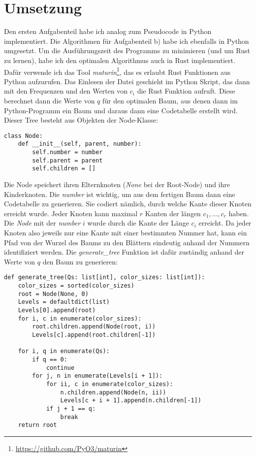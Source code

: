 \documentclass[a4paper,10pt,ngerman]{scrartcl}
\begin{document}
    \section{Umsetzung}
    Den ersten Aufgabenteil habe ich analog zum Pseudocode in Python implementiert.
    Die Algorithmen für Aufgabenteil b) habe ich ebenfalls in Python umgesetzt.
    Um die Ausführungszeit des Programms zu minimieren (und um Rust zu lernen), habe ich den optimalen Algorithmus auch in Rust implementiert.
    Dafür verwende ich das Tool \textit{maturin}\footnote{\url{https://github.com/PyO3/maturin}}, das es erlaubt Rust Funktionen aus Python aufzurufen.
    Das Einlesen der Datei geschieht im Python Skript, das dann mit den Frequenzen und den Werten von $c_i$ die Rust Funktion aufruft.
    Diese berechnet dann die Werte von $q$ für den optimalen Baum, aus denen dann im Python-Programm ein Baum und daraus dann eine Codetabelle erstellt wird.
    Dieser Tree besteht aus Objekten der Node-Klasse:
    \begin{verbatim}
class Node:
    def __init__(self, parent, number):
        self.number = number
        self.parent = parent
        self.children = []
    \end{verbatim}%
    Die Node speichert ihren Elternknoten (\textit{None} bei der Root-Node) und ihre Kinderknoten.
    Die \textit{number} ist wichtig, um aus dem fertigen Baum dann eine Codetabelle zu generieren.
    Sie codiert nämlich, durch welche Kante dieser Knoten erreicht wurde.
    Jeder Knoten kann maximal $r$ Kanten der längen $c_1, \dots, c_r$ haben.
    Die \textit{Node} mit der \textit{number} $i$ wurde durch die Kante der Länge $c_i$ erreicht.
    Da jeder Knoten also jeweils nur eine Kante mit einer bestimmten Nummer hat, kann ein Pfad von der Wurzel des Baums zu den Blättern eindeutig anhand der Nummern identifiziert werden.
    Die \textit{generate\_tree} Funktion ist dafür zuständig anhand der Werte von $q$ den Baum zu generieren:
    \begin{verbatim}
def generate_tree(Qs: list[int], color_sizes: list[int]):
    color_sizes = sorted(color_sizes)
    root = Node(None, 0)
    Levels = defaultdict(list)
    Levels[0].append(root)
    for i, c in enumerate(color_sizes):
        root.children.append(Node(root, i))
        Levels[c].append(root.children[-1])

    for i, q in enumerate(Qs):
        if q == 0:
            continue
        for j, n in enumerate(Levels[i + 1]):
            for ii, c in enumerate(color_sizes):
                n.children.append(Node(n, ii))
                Levels[c + i + 1].append(n.children[-1])
            if j + 1 == q:
                break
    return root
    \end{verbatim}%
\end{document}
